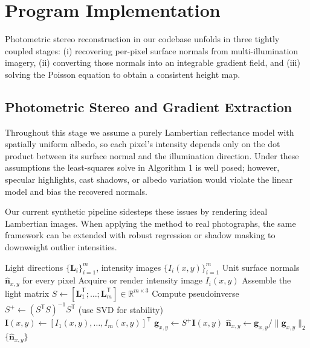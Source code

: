 \documentclass[11pt]{article}
\begin{document}
\newpage

\section{Program Implementation}\label{sec:implementation}

Photometric stereo reconstruction in our codebase unfolds in three tightly coupled stages: (i) recovering per-pixel surface normals from
multi-illumination imagery, (ii) converting those normals into an integrable gradient field, and (iii) solving the Poisson equation to
obtain a consistent height map.

\subsection{Photometric Stereo and Gradient Extraction}

Throughout this stage we assume a purely Lambertian reflectance model with spatially uniform albedo, so each pixel's intensity depends
only on the dot product between its surface normal and the illumination direction. Under these assumptions the least-squares solve in
Algorithm 1 is well posed; however, specular highlights, cast shadows, or albedo variation would violate the linear model and bias the
recovered normals. 

Our current synthetic pipeline sidesteps these issues by rendering ideal Lambertian images. When applying the method
to real photographs, the same framework can be extended with robust regression or shadow masking to downweight outlier intensities.

\begin{algorithm}[H]
\caption{Photometric Stereo Normal Recovery}
\begin{algorithmic}[1]
\REQUIRE Light directions $\{\mathbf{L}_i\}_{i=1}^m$, intensity images $\{I_i(x,y)\}_{i=1}^m$
\ENSURE Unit surface normals $\hat{\mathbf{n}}_{x,y}$ for every pixel
    \STATE Acquire or render intensity image $I_i(x,y)$
\ENDFOR
\STATE Assemble the light matrix $S \leftarrow [\mathbf{L}_1^\mathsf{T}; \dots; \mathbf{L}_m^\mathsf{T}] \in \mathbb{R}^{m \times 3}$
\STATE Compute pseudoinverse $S^+ \leftarrow (S^\mathsf{T} S)^{-1} S^\mathsf{T}$ (use SVD for stability)
    \STATE $\mathbf{I}(x,y) \leftarrow [I_1(x,y), \dots, I_m(x,y)]^\mathsf{T}$
    \STATE $\mathbf{g}_{x,y} \leftarrow S^+ \mathbf{I}(x,y)$
    \STATE $\hat{\mathbf{n}}_{x,y} \leftarrow \mathbf{g}_{x,y} / \|\mathbf{g}_{x,y}\|_2$
\ENDFOR
\RETURN $\{\hat{\mathbf{n}}_{x,y}\}$
\end{algorithmic}
\end{algorithm}
\end{document}
